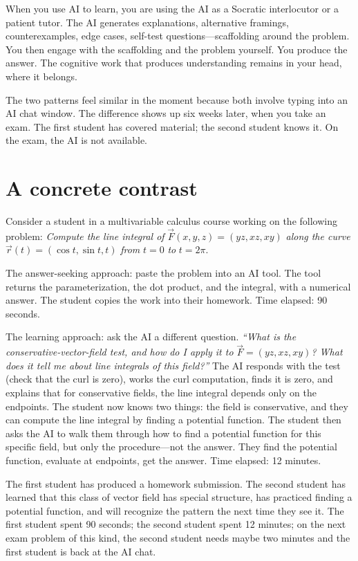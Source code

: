 \documentclass[11pt]{book}
\begin{document}
When you use AI to learn, you are using the AI as a Socratic interlocutor or a patient tutor. The AI generates explanations, alternative framings, counterexamples, edge cases, self-test questions---scaffolding around the problem. You then engage with the scaffolding and the problem yourself. You produce the answer. The cognitive work that produces understanding remains in your head, where it belongs.

The two patterns feel similar in the moment because both involve typing into an AI chat window. The difference shows up six weeks later, when you take an exam. The first student has covered material; the second student knows it. On the exam, the AI is not available.

\section{A concrete contrast}

Consider a student in a multivariable calculus course working on the following problem: \emph{Compute the line integral of} $\vec{F}(x,y,z) = (yz, xz, xy)$ \emph{along the curve} $\vec{r}(t) = (\cos t, \sin t, t)$ \emph{from} $t=0$ \emph{to} $t = 2\pi$.

The answer-seeking approach: paste the problem into an AI tool. The tool returns the parameterization, the dot product, and the integral, with a numerical answer. The student copies the work into their homework. Time elapsed: 90 seconds.

The learning approach: ask the AI a different question. \emph{``What is the conservative-vector-field test, and how do I apply it to} $\vec{F} = (yz, xz, xy)$\emph{? What does it tell me about line integrals of this field?''} The AI responds with the test (check that the curl is zero), works the curl computation, finds it is zero, and explains that for conservative fields, the line integral depends only on the endpoints. The student now knows two things: the field is conservative, and they can compute the line integral by finding a potential function. The student then asks the AI to walk them through how to find a potential function for this specific field, but only the procedure---not the answer. They find the potential function, evaluate at endpoints, get the answer. Time elapsed: 12 minutes.

The first student has produced a homework submission. The second student has learned that this class of vector field has special structure, has practiced finding a potential function, and will recognize the pattern the next time they see it. The first student spent 90 seconds; the second student spent 12 minutes; on the next exam problem of this kind, the second student needs maybe two minutes and the first student is back at the AI chat.
\end{document}

